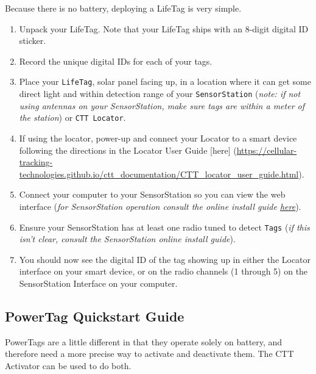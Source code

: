 \documentclass[
]{article}
\begin{document}
Because there is no battery, deploying a LifeTag is very simple.

\begin{enumerate}
\def\labelenumi{\arabic{enumi}.}
\item
  Unpack your LifeTag. Note that your LifeTag ships with an 8-digit
  digital ID sticker.
\item
  Record the unique digital IDs for each of your tags.
\item
  Place your \texttt{LifeTag}, solar panel facing up, in a location
  where it can get some direct light and within detection range of your
  \texttt{SensorStation} (\emph{note: if not using antennas on your
  SensorStation, make sure tags are within a meter of the station}) or
  \texttt{CTT\ Locator}.
\item
  If using the locator, power-up and connect your Locator to a smart
  device following the directions in the Locator User Guide {[}here{]}
  (\url{https://cellular-tracking-technologies.github.io/ctt_documentation/CTT_locator_user_guide.html}).
\item
  Connect your computer to your SensorStation so you can view the web
  interface (\emph{for SensorStation operation consult the online
  install guide
  \href{https://cellular-tracking-technologies.github.io/ctt_documentation/v2-SensorStation-User-Guide.html\#connecting-to-your-sensorstation-web-interface}{here}}).
\item
  Ensure your SensorStation has at least one radio tuned to detect
  \texttt{Tags} (\emph{if this isn't clear, consult the SensorStation
  online install guide}).
\item
  You should now see the digital ID of the tag showing up in either the
  Locator interface on your smart device, or on the radio channels (1
  through 5) on the SensorStation Interface on your computer.
\end{enumerate}

\hypertarget{powertag-quickstart-guide}{%
\subsection{PowerTag Quickstart Guide}\label{powertag-quickstart-guide}}

PowerTags are a little different in that they operate solely on battery,
and therefore need a more precise way to activate and deactivate them.
The CTT Activator can be used to do both.
\end{document}
